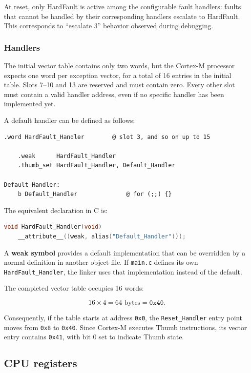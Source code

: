 \documentclass[a4paper,11pt]{article}
\begin{document}
At reset, only HardFault is active among the configurable fault handlers:
faults that cannot be handled by their corresponding handlers escalate to
HardFault. This corresponds to ``escalate 3'' behavior observed during debugging.

\subsubsection{Handlers}

The initial vector table contains only two words, but the Cortex-M processor
expects one word per exception vector, for a total of 16 entries in the
initial table. Slots 7--10 and 13 are reserved and must contain zero.
Every other slot must contain a valid handler address, even if no specific
handler has been implemented yet.

A default handler can be defined as follows:

\begin{lstlisting}[language={[x86masm]Assembler}]
    .word HardFault_Handler        @ slot 3, and so on up to 15

    .weak      HardFault_Handler
    .thumb_set HardFault_Handler, Default_Handler

Default_Handler:
    b Default_Handler              @ for (;;) {}
\end{lstlisting}

The equivalent declaration in C is:

\begin{lstlisting}[language=C]
void HardFault_Handler(void)
    __attribute__((weak, alias("Default_Handler")));
\end{lstlisting}

A \textbf{weak symbol} provides a default implementation that can be
overridden by a normal definition in another object file. If
\texttt{main.c} defines its own \texttt{HardFault\_Handler}, the linker
uses that implementation instead of the default.

The completed vector table occupies 16 words:

\[
	16 \times 4 = 64 \text{ bytes} = \texttt{0x40}.
\]

Consequently, if the table starts at address \texttt{0x0}, the
\texttt{Reset\_Handler} entry point moves from \texttt{0x8} to
\texttt{0x40}. Since Cortex-M executes Thumb instructions, its vector
entry contains \texttt{0x41}, with bit 0 set to indicate Thumb state.

\subsection{CPU registers}
\end{document}
